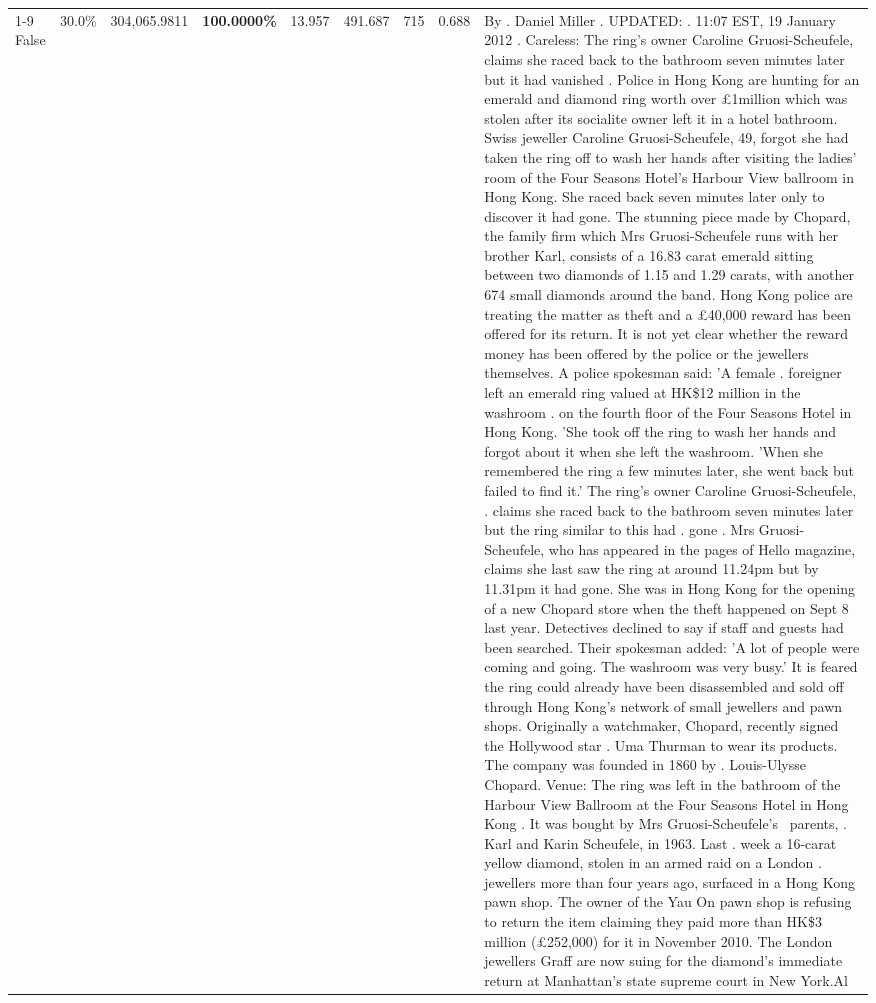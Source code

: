 \begin{table}[H]
\begin{tabular}{lllrlllll}
\cline{1-9}
False & 30.0\% & 304,065.9811 & \bfseries \color{red} 100.0000\% & 13.957 & 491.687 & 715 & 0.688 & By . Daniel Miller . UPDATED: . 11:07 EST, 19 January 2012 . Careless: The ring's owner Caroline Gruosi-Scheufele, claims she raced back to the bathroom seven minutes later but it had vanished . Police in Hong Kong are hunting for an emerald and diamond ring worth over £1million which was stolen after its socialite owner left it in a hotel bathroom. Swiss jeweller Caroline Gruosi-Scheufele, 49, forgot she had taken the ring off to wash her hands after visiting the ladies' room of the Four Seasons Hotel's Harbour View ballroom in Hong Kong. She raced back seven minutes later only to discover it had gone. The stunning piece made by Chopard, the family firm which Mrs Gruosi-Scheufele runs with her brother Karl, consists of a 16.83 carat emerald sitting between two diamonds of 1.15 and 1.29 carats, with another 674 small diamonds around the band. Hong Kong police are treating the matter as theft and a £40,000 reward has been offered for its return. It is not yet clear whether the reward money has been offered by the police or the jewellers themselves. A police spokesman said: 'A female . foreigner left an emerald ring valued at HK\$12 million in the washroom . on the fourth floor of the Four Seasons Hotel in Hong Kong. 'She took off the ring to wash her hands and forgot about it when she left the washroom. 'When she remembered the ring a few minutes later, she went back but failed to find it.' The ring's owner Caroline Gruosi-Scheufele, . claims she raced back to the bathroom seven minutes later but the ring similar to this had . gone . Mrs Gruosi-Scheufele, who has appeared in the pages of Hello magazine, claims she last saw the ring at around 11.24pm but by 11.31pm it had gone. She was in Hong Kong for the opening of a new Chopard store when the theft happened on Sept 8 last year. Detectives declined to say if staff and guests had been searched. Their spokesman added: 'A lot of people were coming and going. The washroom was very busy.' It is feared the ring could already have been disassembled and sold off through Hong Kong's network of small jewellers and pawn shops. Originally a watchmaker, Chopard, recently signed the Hollywood star . Uma Thurman to wear its products. The company was founded in 1860 by . Louis-Ulysse Chopard. Venue: The ring was left in the bathroom of the Harbour View Ballroom at the Four Seasons Hotel in Hong Kong . It was bought by Mrs Gruosi-Scheufele's  parents, . Karl and Karin Scheufele, in 1963. Last . week a 16-carat yellow diamond, stolen in an armed raid on a London . jewellers more than four years ago, surfaced in a Hong Kong pawn shop. The owner of the Yau On pawn shop is refusing to return the item claiming they paid more than HK\$3 million (£252,000) for it in November 2010. The London jewellers Graff are now suing for the diamond’s immediate return at Manhattan’s state supreme court in New York.Al \\

\end{tabular}
\end{table}
